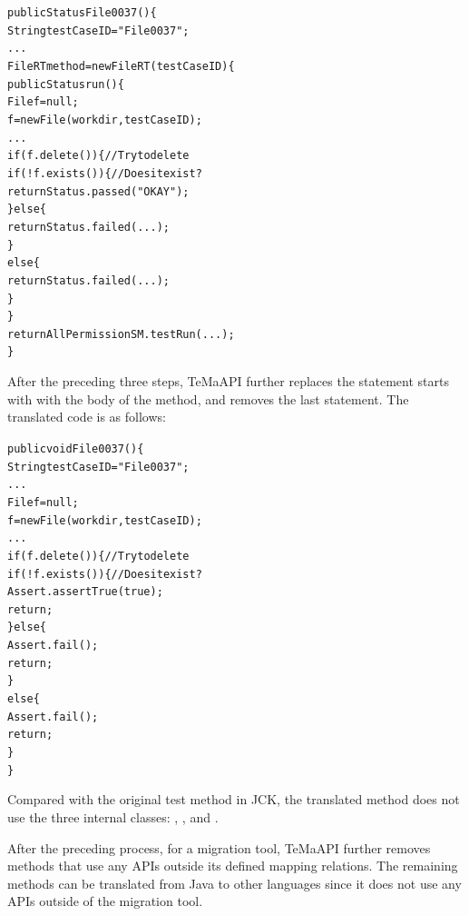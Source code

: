 \begin{CodeOut}%
\begin{alltt}
  public Status File0037()\{
    String testCaseID = "File0037";
    ...
    FileRT method = new FileRT(testCaseID) \{
     public Status run() \{
       File f = null;
       f = new File(workdir, testCaseID);
       ...
       if (f.delete()) \{ // Try to delete
         if (!f.exists()) \{ // Does it exist?
           return Status.passed("OKAY");
         \}else\{
            return Status.failed(...);
         \}
       else\{
           return Status.failed(...);
       \}
    \}
     return AllPermissionSM.testRun(...);
  \}
\end{alltt}
\end{CodeOut}

After the preceding three steps, TeMaAPI further replaces the statement starts with  with the body of the  method, and removes the last statement. The translated code is as follows:

\begin{CodeOut}%
\begin{alltt}
  public void File0037()\{
    String testCaseID = "File0037";
    ...
    File f = null;
    f = new File(workdir, testCaseID);
    ...
    if (f.delete()) \{ // Try to delete
      if (!f.exists()) \{ // Does it exist?
        Assert.assertTrue(true);
        return;
     \}else\{
        Assert.fail();
        return;
     \}
   else\{
       Assert.fail();
       return;
   \}
  \}
\end{alltt}
\end{CodeOut}

Compared with the original test method in JCK, the translated method does not use the three internal classes: , , and . 

After the preceding process, for a migration tool, TeMaAPI further removes methods that use any APIs outside its defined mapping relations. The remaining methods can be translated from Java to other languages since it does not use any APIs outside of the migration tool.


